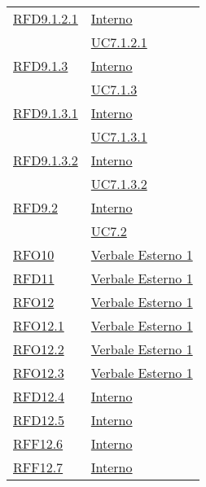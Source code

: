 \begin{longtable}{|>{\centering}m{5cm}|m{5cm}<{\centering}|}
\hyperlink{RFD9.1.2.1}{RFD9.1.2.1} & \hyperlink{Interno}{Interno}\\
& \hyperref[UC7.1.2.1]{UC7.1.2.1}\\ \hline

\hyperlink{RFD9.1.3}{RFD9.1.3} & \hyperlink{Interno}{Interno}\\
& \hyperref[UC7.1.3]{UC7.1.3}\\ \hline

\hyperlink{RFD9.1.3.1}{RFD9.1.3.1} & \hyperlink{Interno}{Interno}\\
& \hyperref[UC7.1.3.1]{UC7.1.3.1}\\ \hline

\hyperlink{RFD9.1.3.2}{RFD9.1.3.2} & \hyperlink{Interno}{Interno}\\
& \hyperref[UC7.1.3.2]{UC7.1.3.2}\\ \hline

\hyperlink{RFD9.2}{RFD9.2} & \hyperlink{Interno}{Interno}\\
& \hyperref[UC7.2]{UC7.2}\\ \hline

\hyperlink{RFO10}{RFO10} & \hyperlink{Verbale Esterno 1}{Verbale Esterno 1}\\ \hline

\hyperlink{RFD11}{RFD11} & \hyperlink{Verbale Esterno 1}{Verbale Esterno 1}\\ \hline

\hyperlink{RFO12}{RFO12} & \hyperlink{Verbale Esterno 1}{Verbale Esterno 1}\\ \hline

\hyperlink{RFO12.1}{RFO12.1} & \hyperlink{Verbale Esterno 1}{Verbale Esterno 1}\\ \hline

\hyperlink{RFO12.2}{RFO12.2} & \hyperlink{Verbale Esterno 1}{Verbale Esterno 1}\\ \hline

\hyperlink{RFO12.3}{RFO12.3} & \hyperlink{Verbale Esterno 1}{Verbale Esterno 1}\\ \hline

\hyperlink{RFD12.4}{RFD12.4} & \hyperlink{Interno}{Interno}\\ \hline

\hyperlink{RFD12.5}{RFD12.5} & \hyperlink{Interno}{Interno}\\ \hline

\hyperlink{RFF12.6}{RFF12.6} & \hyperlink{Interno}{Interno}\\ \hline

\hyperlink{RFF12.7}{RFF12.7} & \hyperlink{Interno}{Interno}\\ \hline


\end{longtable}
